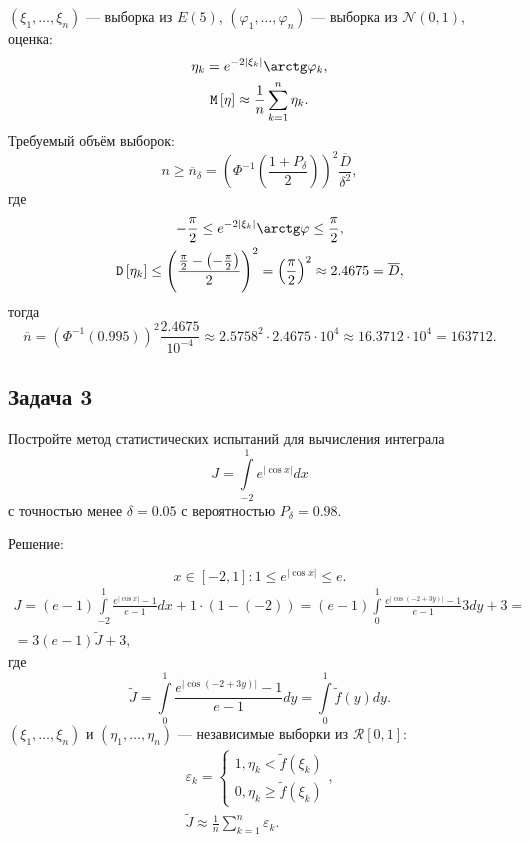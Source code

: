 \documentclass[a4paper,12pt]{article}
\newcommand{\modulus}[1]{\left | #1 \right |}
\newcommand{\expectation}[1]{\mathtt{M} \left[ #1 \right]}
\newcommand{\variance}[1]{\mathtt{D} \left[ #1 \right]}
\newif\ifsolutions
\begin{document}
    $(\xi_1, \dots, \xi_n)$ --- выборка из $E(5)$, $(\varphi_1, \dots, \varphi_n)$ --- выборка из $\mathcal{N} (0, 1)$, оценка:
    \begin{gather*}
        \eta_k = e^{- 2 \modulus{\xi_k}} \arctg \varphi_k , \\
        \expectation{\eta} \approx \frac{1}{n} \sum_{k=1}^n \eta_k .
    \end{gather*}
    Требуемый объём выборок:
    \[
        n
        \ge \overline{n}_\delta
        = \left( \Phi^{-1} \left( \frac{1 + P_\delta}{2} \right) \right)^2 \frac{\overline{D}}{\delta^2} ,
    \]
    где
    \begin{gather*}
        - \frac{\pi}{2} \le e^{-2 \modulus{\xi_k}} \arctg \varphi \le \frac{\pi}{2}, \\
        \variance{\eta_k}
        \le \left( \frac{\frac{\pi}{2} - \left(-\frac{\pi}{2}\right)}{2} \right)^2
        = \left( \frac{\pi}{2} \right)^2
        \approx 2.4675
        = \overline{D} ,
    \end{gather*}
    тогда
    \[
        \overline{n}
        = \left( \Phi^{-1} \left( 0.995 \right) \right)^2 \frac{2.4675}{10^{-4}}
        \approx 2.5758^2 \cdot 2.4675 \cdot 10^4
        \approx 16.3712 \cdot 10^4
        = 163 712 .
    \]
\fi

\subsection*{Задача 3}

Постройте метод статистических испытаний для вычисления интеграла
\[
    J = \int \limits_{-2}^{1} e^{\modulus{\cos x}} dx
\]
с точностью менее $\delta = 0.05$ с вероятностью $P_\delta = 0.98$.

\ifsolutions
    Решение:

    \[
        x \in [-2, 1]: 1 \le e^{\modulus{\cos x}} \le e .
    \]
\begin{multline*}
    J
    = (e-1) \int \limits_{-2}^{1} \frac{e^{\modulus{\cos x}} - 1}{e-1} dx + 1 \cdot (1 - (-2))
    = (e-1) \int \limits_{0}^{1} \frac{e^{\modulus{\cos (-2 + 3 y)}} - 1}{e-1} 3 dy + 3 = \\
    = 3 (e-1) \widetilde{J} + 3 ,
\end{multline*}
где
\[
    \widetilde{J}
    = \int \limits_{0}^{1} \frac{e^{\modulus{\cos (-2 + 3 y)}} - 1}{e-1} dy
    = \int \limits_{0}^{1} \widetilde{f}(y) dy .
\]
$(\xi_1, \dots, \xi_n)$ и $(\eta_1, \dots, \eta_n)$ --- независимые выборки из $\mathcal{R} [0, 1]$:
\begin{gather*}
    \varepsilon_k = \left \{
        \begin{array}{ll}
            1, \eta_k < \widetilde{f}(\xi_k) \\
            0, \eta_k \ge \widetilde{f}(\xi_k)
        \end{array}
        \right . , \\
    \widetilde{J} \approx \frac{1}{n} \sum_{k=1}^n \varepsilon_k .
\end{gather*}
\end{document}
